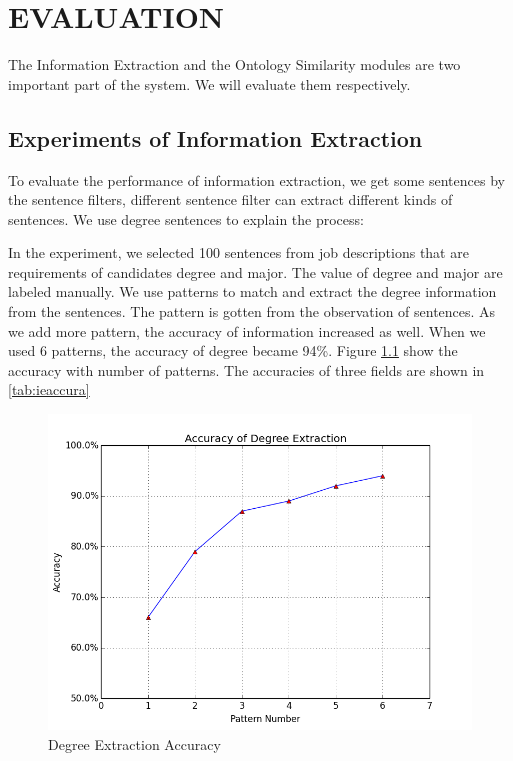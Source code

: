 \chapter{EVALUATION}

The Information Extraction and the Ontology Similarity modules are two important part of the system.  We will evaluate them respectively.

\section{Experiments of Information Extraction }

To evaluate the performance of information extraction, we get some sentences by the sentence filters, different sentence filter can extract different kinds of sentences. We use degree sentences to explain the process:

In the experiment, we selected 100 sentences from job descriptions that are requirements of candidates degree and major. The value of degree and major are labeled manually. We use patterns to  match and extract the degree information from the sentences. The pattern is gotten from the observation of sentences. As we add more pattern, the accuracy of information increased as well. When we used 6 patterns, the accuracy of degree became 94\%. Figure \ref{fig:degree_accuracy} show the accuracy with number of patterns. The accuracies of three fields are shown in \ref{tab:ieaccura}

\begin{figure}[htbp]
  \centering
  \includegraphics[scale=0.5]{images/degree_accuracy.png}
  \caption{Degree Extraction  Accuracy}
  \label{fig:degree_accuracy}
\end{figure}


